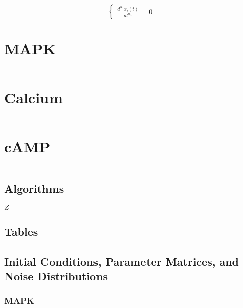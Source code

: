 \begin{equation}
\begin{cases}
\frac{d^{\alpha_{1}} x_{i}(t)}{dt^{\alpha_{1}}}=0 
\end{cases}
\end{equation}

\section{MAPK}

\begin{equation}
\end{equation}

\section{Calcium} 

\begin{equation}
\end{equation}


\section{cAMP}

\begin{equation}
\end{equation}



\subsection{Algorithms}

\begin{algorithm}[H]
	\footnotesize
	\begin{algorithmic}[1]
		\Return $Z$
	\end{algorithmic}
	\caption{}\label{Algorithm_1}
\end{algorithm}

\subsection{Tables}

\subsection{Initial Conditions, Parameter Matrices, and Noise Distributions}

\subsubsection{MAPK} 

